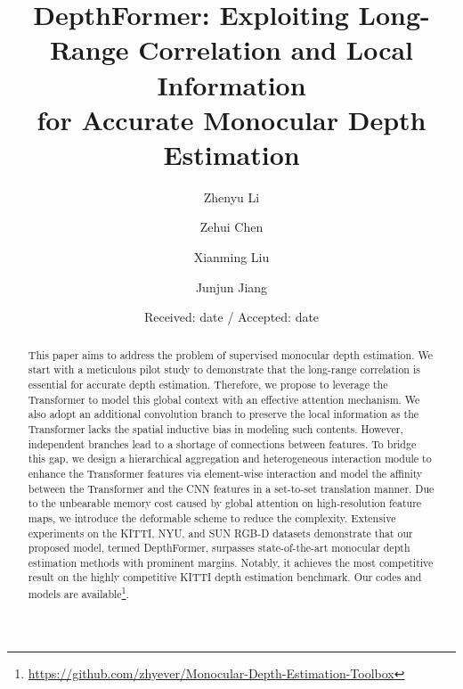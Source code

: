\documentclass[twocolumn]{svjour3}    \pdfoutput=1
\begin{document}
\title{DepthFormer: Exploiting Long-Range Correlation and Local Information \\ for Accurate Monocular Depth Estimation}

\author{Zhenyu Li \and Zehui Chen \and Xianming Liu \and  Junjun Jiang}


\date{Received: date / Accepted: date}


\maketitle

\begin{abstract}
   This paper aims to address the problem of supervised monocular depth estimation. We start with a meticulous pilot study to demonstrate that the long-range correlation is essential for accurate depth estimation. Therefore, we propose to leverage the Transformer to model this global context with an effective attention mechanism. We also adopt an additional convolution branch to preserve the local information as the Transformer lacks the spatial inductive bias in modeling such contents. However, independent branches lead to a shortage of connections between features. To bridge this gap, we design a hierarchical aggregation and heterogeneous interaction module to enhance the Transformer features via element-wise interaction and model the affinity between the Transformer and the CNN features in a set-to-set translation manner. Due to the unbearable memory cost caused by global attention on high-resolution feature maps, we introduce the deformable scheme to reduce the complexity. Extensive experiments on the KITTI, NYU, and SUN RGB-D datasets demonstrate that our proposed model, termed DepthFormer, surpasses state-of-the-art monocular depth estimation methods with prominent margins. Notably, it achieves the most competitive result on the highly competitive KITTI depth estimation benchmark. Our codes and models are available\footnote{\url{https://github.com/zhyever/Monocular-Depth-Estimation-Toolbox}}.

\end{abstract}
\end{document}
